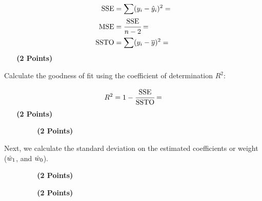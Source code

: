 \documentclass[12pt, xcolor=dvipsnames,svgnames,x11names]{article}
\begin{document}
\begin{equation}
\begin{aligned}
        \textrm{SSE} & = \sum (y_i - {\hat y}_i)^2 = \\
        \textrm{MSE} & = \cfrac{\textrm{SSE}}{n - 2} = \\
        \textrm{SSTO} & = \sum (y_i - {\overline y})^2 = 
\end{aligned}
\end{equation}
\textbf{~~~(2 Points)}

Calculate the goodness of fit using the coefficient of determination $R^2$:


\begin{equation}
    R^2 = 1 - \cfrac{\textrm{SSE}}{\textrm{SSTO}} = 
\end{equation}
\textbf{~~~(2 Points)}


\begin{figure}[h]
\textbf{~~~(2 Points)}
\end{figure}


Next, we calculate the standard deviation on the estimated coefficients or weight (${\hat w}_1$, and ${\hat w}_0$).

\begin{figure}[h]
\textbf{~~~(2 Points)}
\end{figure}


\begin{figure}[h]
\textbf{~~~(2 Points)}
\end{figure}
\end{document}
